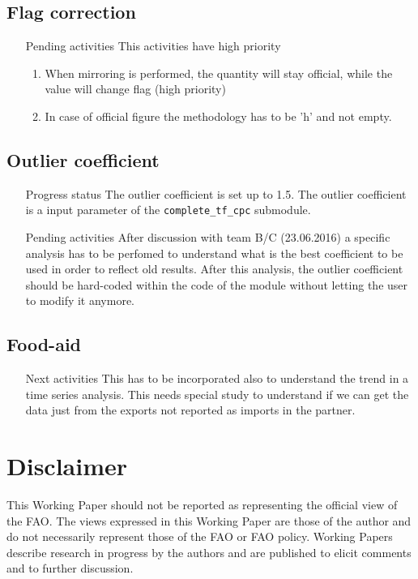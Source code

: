 \documentclass[nojss]{jss}\usepackage[]{graphicx}\usepackage[]{color}
\begin{document}
\subsection{Flag correction}
\begin{itemize}
\item[Pending activities] This activities have high priority
\begin{enumerate}
\item When mirroring is performed, the quantity will stay official, while the value will change flag (high priority)
\item In case of official figure the methodology has to be 'h' and not empty.
\end{enumerate}
\end{itemize}

\subsection{Outlier coefficient}
\begin{itemize}
\item[Progress status] The outlier coefficient is set up to 1.5. The outlier coefficient is a input parameter of the {\tt complete\_tf\_cpc} submodule.
\item[Pending activities] After discussion with team B/C (23.06.2016) a specific analysis has to be perfomed to understand what is the best coefficient to be used in order to reflect old results. After this analysis, the outlier coefficient should be hard-coded within the code of the module without letting the user to modify it anymore.
\end{itemize}


\subsection{Food-aid}
\begin{itemize}
\item[Next activities] This has to be incorporated also to understand the trend in a time series analysis. This needs special study to understand if we can get the data just from the exports not reported as imports in the partner.
\end{itemize}

\section*{Disclaimer}
This Working Paper should not be reported as representing the official view of
the FAO. The views expressed in this Working Paper are those of the
author and do not necessarily represent those of the FAO or FAO
policy. Working Papers describe research in progress by the authors and
are published to elicit comments and to further discussion.\\
\end{document}

